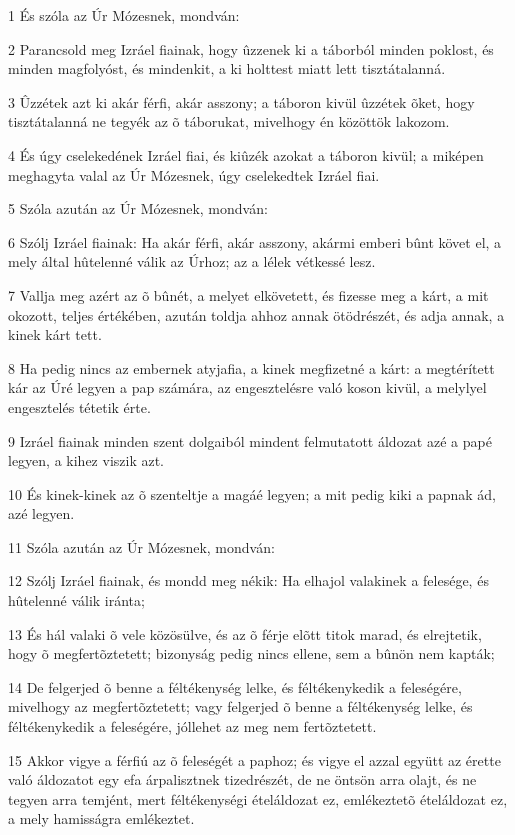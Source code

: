 \par 1 És szóla az Úr Mózesnek, mondván:
\par 2 Parancsold meg Izráel fiainak, hogy ûzzenek ki a táborból minden poklost, és minden  magfolyóst, és mindenkit, a ki holttest miatt lett tisztátalanná.
\par 3 Ûzzétek azt ki akár férfi, akár asszony; a táboron kivül ûzzétek õket, hogy tisztátalanná ne tegyék az õ táborukat, mivelhogy én közöttök lakozom.
\par 4 És úgy cselekedének Izráel fiai, és kiûzék azokat a táboron kivül; a miképen meghagyta valal az Úr Mózesnek, úgy cselekedtek Izráel fiai.
\par 5 Szóla azután az Úr Mózesnek, mondván:
\par 6 Szólj Izráel fiainak: Ha akár férfi, akár asszony, akármi emberi bûnt követ el, a mely által hûtelenné válik az Úrhoz; az a lélek vétkessé lesz.
\par 7 Vallja meg azért az õ bûnét, a melyet elkövetett, és fizesse meg a kárt, a mit okozott, teljes értékében, azután toldja ahhoz annak ötödrészét, és adja annak, a kinek kárt tett.
\par 8 Ha pedig nincs az embernek atyjafia, a kinek megfizetné a kárt: a megtérített kár az Úré legyen a pap számára, az engesztelésre való koson kivül, a melylyel engesztelés tétetik érte.
\par 9 Izráel fiainak minden szent dolgaiból mindent felmutatott áldozat azé a papé legyen, a kihez viszik azt.
\par 10 És kinek-kinek az õ szenteltje a magáé legyen; a mit pedig kiki a papnak ád, azé legyen.
\par 11 Szóla azután az Úr Mózesnek, mondván:
\par 12 Szólj Izráel fiainak, és mondd meg nékik: Ha elhajol valakinek a felesége, és hûtelenné válik iránta;
\par 13 És hál valaki õ vele közösülve, és az õ férje elõtt titok marad, és elrejtetik, hogy õ megfertõztetett; bizonyság pedig nincs ellene, sem a bûnön nem kapták;
\par 14 De felgerjed õ benne a féltékenység lelke, és féltékenykedik a feleségére, mivelhogy az megfertõztetett; vagy felgerjed õ benne a féltékenység lelke, és féltékenykedik a feleségére, jóllehet az meg nem fertõztetett.
\par 15 Akkor vigye a férfiú az õ feleségét a paphoz; és vigye el azzal együtt az érette való áldozatot egy efa árpalisztnek tizedrészét, de ne öntsön arra olajt, és ne tegyen arra temjént, mert féltékenységi ételáldozat ez, emlékeztetõ ételáldozat ez, a mely hamisságra emlékeztet.
